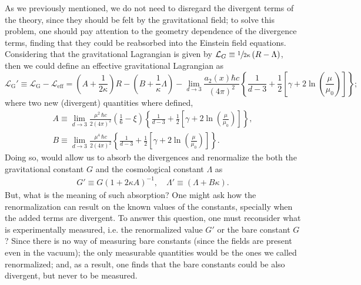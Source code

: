 As we previously mentioned, we do not need to disregard the divergent terms of the theory, since they should be felt by the gravitational field; to solve this problem, one should pay attention to the geometry dependence of the divergence terms, finding that they could be reabsorbed into the Einstein field equations. Considering that the gravitational Lagrangian is given by $\mathcal{L}_G\equiv \sfrac{1}{2\kappa}\left(R-\Lambda\right)$, then we could define an effective gravitational Lagrangian as 
\begin{equation}
	\mathcal{L}_{\text{G}}'\equiv\mathcal{L}_{\text{G}}-\mathcal{L}_{\text{eff}}=\left(A+\frac{1}{2\kappa}\right)R-\left(B+\frac{1}{\kappa}\Lambda\right)-\lim\limits_{d\to 3}\frac{a_2(x)\hbar c}{(4\pi)^2}\left\{\frac{1}{d-3}+\frac{1}{2}\left[\gamma+2\ln\left(\frac{\mu}{\mu_0}\right)\right]\right\};
\end{equation}
where two new (divergent) quantities where defined, 
\begin{subequations}\label{eq: Effective Gravitational lagrangian}
	\begin{gather}
		A\equiv \lim\limits_{d\to 3}\frac{\mu^2\,\hbar c}{2(4\pi)^2}\left(\frac{1}{6}-\xi\right)\left\{\frac{1}{d-3}+\frac{1}{2}\left[\gamma+2\ln\left(\frac{\mu}{\mu_0}\right)\right]\right\},\\
		B\equiv \lim\limits_{d\to 3}\frac{\mu^4\,\hbar c}{2(4\pi)^2}\left\{\frac{1}{d-3}+\frac{1}{2}\left[\gamma+2\ln\left(\frac{\mu}{\mu_0}\right)\right]\right\}.
	\end{gather}
\end{subequations}
Doing so, would allow us to absorb the divergences and renormalize the both the gravitational constant $G$ and the cosmological constant $\Lambda$ as
\begin{subequations}
	\begin{gather}
		G'\equiv G\left(1+2\kappa A\right)^{-1},\quad \Lambda'\equiv \left(\Lambda+B\kappa\right).\tag{\theequation \,\,a,b}
	\end{gather}
\end{subequations}
But, what is the meaning of such absorption? One might ask how the renormalization can result on the known values of the constants, specially when the added terms are divergent. To answer this question, one must reconsider what is experimentally measured, i.e. the renormalized value $G'$ or the bare constant $G$? Since there is no way of measuring bare constants (since the fields are present even in the vacuum); the only measurable quantities would be the ones we called renormalized; and, as a result, one finds that the bare constants could be also divergent, but never to be measured.  

